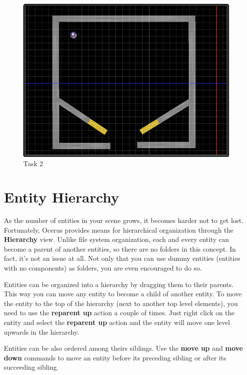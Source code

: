 \documentclass[a4paper,12pt]{article}
\begin{document}
\begin{figure}[ht]
 \begin{center}
  \includegraphics[scale=0.65]{Task2}
 \end{center}
 \caption{Task 2}
 \label{fig:task_2}
\end{figure}

\section{Entity Hierarchy}
As the number of entities in your scene grows, it becomes harder not to get lost. Fortunately, Ocerus provides means for hierarchical organization through the \textbf{Hierarchy} view. Unlike file system organization, each and every entity can become a parent of another entities, so there are no folders in this concept. In fact, it's not an issue at all. Not only that you can use dummy entities (entities with no components) as folders, you are even encouraged to do so.

Entities can be organized into a hierarchy by dragging them to their parents. This way you can move any entity to become a child of another entity. To move the entity to the top of the hierarchy (next to another top level elements), you need to use the \textbf{reparent up} action a couple of times. Just right click on the entity and select the \textbf{reparent up} action and the entity will move one level upwards in the hierarchy.

Entities can be also ordered among theirs siblings. Use the \textbf{move up} and \textbf{move down} commands to move an entity before its preceding sibling or after its succeeding sibling.
\end{document}
